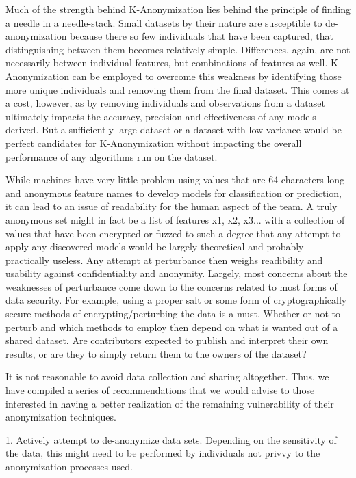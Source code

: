 \documentclass[10pt,journal,compsoc]{IEEEtran}
\begin{document}
Much of the strength behind K-Anonymization lies behind the principle of finding a needle in a needle-stack. Small datasets by their nature are susceptible to de-anonymization because there so few individuals that have been captured, that distinguishing between them becomes relatively simple. Differences, again, are not necessarily between individual features, but combinations of features as well. K-Anonymization can be employed to overcome this weakness by identifying those more unique individuals and removing them from the final dataset. This comes at a cost, however, as by removing individuals and observations from a dataset ultimately impacts the accuracy, precision and effectiveness of any models derived. But a sufficiently large dataset or a dataset with low variance would be perfect candidates for K-Anonymization without impacting the overall performance of any algorithms run on the dataset.

While machines have very little problem using values that are 64 characters long and anonymous feature names to develop models for classification or prediction, it can lead to an issue of readability for the human aspect of the team. A truly anonymous set might in fact be a list of features x1, x2, x3... with a collection of values that have been encrypted or fuzzed to such a degree that any attempt to apply any discovered models would be largely theoretical and probably practically useless. Any attempt at perturbance then weighs readibility and usability against confidentiality and anonymity. Largely, most concerns about the weaknesses of perturbance come down to the concerns related to most forms of data security. For example, using a proper salt or some form of cryptographically secure methods of encrypting/perturbing the data is a must. Whether or not to perturb and which methods to employ then depend on what is wanted out of a shared dataset.  Are contributors expected to publish and interpret their own results, or are they to simply return them to the owners of the dataset? 

It is not reasonable to avoid data collection and sharing altogether. Thus, we have compiled a series of recommendations that we would advise to those interested in having a better realization of the remaining vulnerability of their anonymization techniques.

1.	Actively attempt to de-anonymize data sets. Depending on the sensitivity of the data, this might need to be performed by individuals not privvy to the anonymization processes used.
\end{document}
